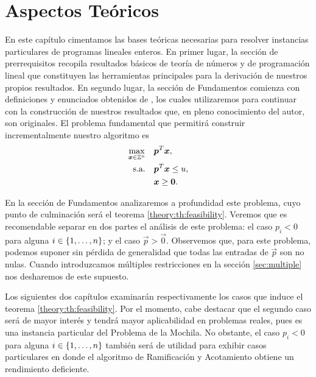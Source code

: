 \chapter{Aspectos Teóricos}


\noindent
En este capítulo cimentamos las bases teóricas necesarias para resolver instancias particulares de
programas lineales enteros. En primer lugar, la sección de prerrequisitos recopila resultados
básicos de teoría de números y de programación lineal que constituyen las herramientas principales para la
derivación de nuestros propios resultados. En segundo lugar, la sección de Fundamentos comienza con
definiciones y enunciados obtenidos de \cite{herr}, los cuales utilizaremos para continuar con la
construcción de nuestros resultados que, en pleno conocimiento del autor, son originales. El
problema fundamental que permitirá construir incrementalmente nuestro algoritmo es
\begin{subequations}
	\label{theory:formulation}
	\begin{align}
		\max_{\boldsymbol{x} \in \mathbb{Z}^n} \quad
			& \boldsymbol{p}^T\boldsymbol{x}, \label{theory:objective} \\
		\text{s.a.} \quad
			& \boldsymbol{p}^T\boldsymbol{x} \leq u, \label{theory:constraint:budget} \\
			& \boldsymbol{x} \geq \boldsymbol{0}. \nonumber
	\end{align}
\end{subequations}

En la sección de Fundamentos analizaremos a profundidad este problema, cuyo punto de
culminación será el teorema \ref{theory:th:feasibility}. Veremos que es recomendable separar en dos
partes el análisis de este problema: el caso $p_i < 0$ para alguna $i \in \lbrace 1, \ldots, n \rbrace$; y
el caso $\vec{p} > \vec{0}$. Observemos que, para este problema, podemos suponer sin pérdida de
generalidad que todas las entradas de $\vec{p}$ son no nulas. Cuando introduzcamos múltiples
restricciones en la sección \ref{sec:multiple} nos desharemos de este supuesto.

Los siguientes dos capítulos examinarán respectivamente los casos que induce el teorema
\ref{theory:th:feasibility}. Por el momento, cabe destacar que el segundo caso será de mayor interés
y tendrá mayor aplicabilidad en problemas reales, pues es una instancia particular del Problema de
la Mochila. No obstante, el caso $p_i < 0$ para alguna $i \in \lbrace 1, \ldots, n \rbrace$ también será de
utilidad para exhibir casos particulares en donde el algoritmo de Ramificación y Acotamiento obtiene
un rendimiento deficiente.

